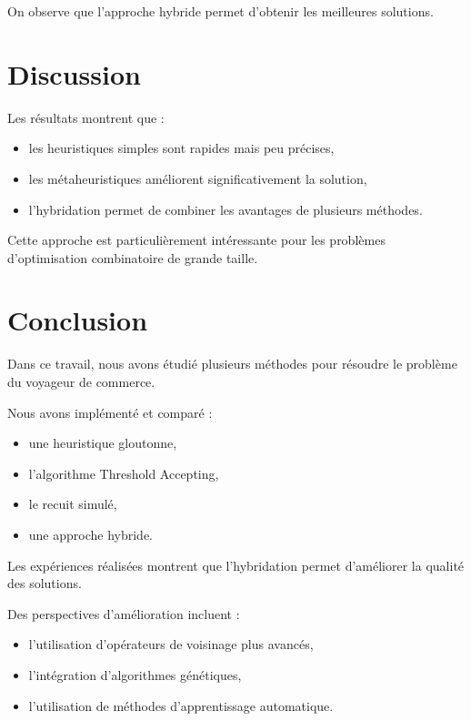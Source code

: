 \documentclass[11pt,a4paper]{article}
\begin{document}
On observe que l’approche hybride permet d’obtenir
les meilleures solutions.

\section{Discussion}

Les résultats montrent que :

\begin{itemize}
\item les heuristiques simples sont rapides mais peu précises,
\item les métaheuristiques améliorent significativement la solution,
\item l’hybridation permet de combiner les avantages de plusieurs méthodes.
\end{itemize}

Cette approche est particulièrement intéressante pour les problèmes
d’optimisation combinatoire de grande taille.

\section{Conclusion}

Dans ce travail, nous avons étudié plusieurs méthodes
pour résoudre le problème du voyageur de commerce.

Nous avons implémenté et comparé :

\begin{itemize}
\item une heuristique gloutonne,
\item l’algorithme Threshold Accepting,
\item le recuit simulé,
\item une approche hybride.
\end{itemize}

Les expériences réalisées montrent que l’hybridation
permet d’améliorer la qualité des solutions.

Des perspectives d’amélioration incluent :

\begin{itemize}
\item l’utilisation d’opérateurs de voisinage plus avancés,
\item l’intégration d’algorithmes génétiques,
\item l’utilisation de méthodes d’apprentissage automatique.
\end{itemize}
\end{document}
